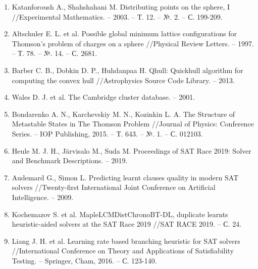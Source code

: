 \begin{enumerate}[leftmargin=0.5cm,topsep=0pt,itemsep=-1ex,partopsep=1ex,parsep=1ex,ref=\arabic{*},label=\arabic{*}.]
\item\label{bib:Katanforoush}
Katanforoush A., Shahshahani M. Distributing points on the sphere, I //Ex\-pe\-ri\-men\-tal Mathematics. – 2003. – Т. 12. – №. 2. – С. 199-209.

\item\label{bib:Altschuler}
Altschuler E. L. et al. Possible global minimum lattice configurations for Thomson's problem of charges on a sphere //Physical Review Letters. – 1997. – Т. 78. – №. 14. – С. 2681.

\item\label{bib:Barber}
Barber C. B., Dobkin D. P., Huhdanpaa H. Qhull: Quickhull algorithm for computing the convex hull //Astrophysics Source Code Library. – 2013.

\item\label{bib:Wales}
Wales D. J. et al. The Cambridge cluster database. – 2001.

\item\label{bib:Bondarenko}
Bondarenko A. N., Karchevskiy M. N., Kozinkin L. A. The Structure of Metastable States in The Thomson Problem //Journal of Physics: Conference Series. – IOP Publishing, 2015. – Т. 643. – №. 1. – С. 012103.

\item\label{bib:HeuleSATRace2019}
Heule M. J. H., Järvisalo M., Suda M. Proceedings of SAT Race 2019: Solver and Benchmark Descriptions. – 2019.

\item\label{bib:Audemard}
Audemard G., Simon L. Predicting learnt clauses quality in modern SAT solvers //Twenty-first International Joint Conference on Artificial Intelligence. – 2009.

\item\label{bib:Kochemazov}
Kochemazov S. et al. MapleLCMDistChronoBT-DL, duplicate learnts heuristic-aided solvers at the SAT Race 2019 //SAT RACE 2019. – С. 24.

\item\label{bib:Liang}
Liang J. H. et al. Learning rate based branching heuristic for SAT solvers //International Conference on Theory and Applications of Satisfiability Testing. – Springer, Cham, 2016. – С. 123-140.

\end{enumerate}

